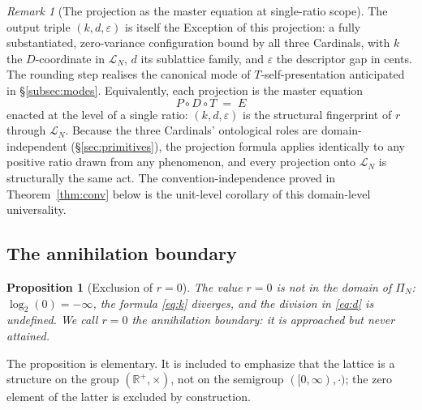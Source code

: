 \documentclass[11pt,a4paper]{article}
\newtheorem{proposition}[theorem]{Proposition}
\theoremstyle{definition}
\theoremstyle{remark}
\newtheorem{remark}[theorem]{Remark}
\newcommand{\R}{\mathbb{R}}
\newcommand{\eps}{\varepsilon}
\newcommand{\PDT}{\ensuremath{P{\circ}D{\circ}T}}
\begin{document}
\begin{remark}[The projection as the master equation at single-ratio scope]\label{rem:single-ratio-exception}
The output triple $(k,d,\eps)$ is itself the Exception of this projection: a fully substantiated, zero-variance configuration bound by all three Cardinals, with $k$ the $D$-coordinate in $\mathcal{L}_{N}$, $d$ its sublattice family, and $\eps$ the descriptor gap in cents. The rounding step realises the canonical mode of $T$-self-presentation anticipated in \S\ref{subsec:modes}. Equivalently, each projection is the master equation
\[
\PDT \;=\; E
\]
enacted at the level of a single ratio: $(k,d,\eps)$ is the structural fingerprint of $r$ through $\mathcal{L}_{N}$. Because the three Cardinals' ontological roles are domain-independent (\S\ref{sec:primitives}), the projection formula applies identically to any positive ratio drawn from any phenomenon, and every projection onto $\mathcal{L}_{N}$ is structurally the same act. The convention-independence proved in Theorem~\ref{thm:conv} below is the unit-level corollary of this domain-level universality.
\end{remark}

\subsection{The annihilation boundary}

\begin{proposition}[Exclusion of $r=0$]\label{prop:zero}
The value $r=0$ is not in the domain of $\Pi_{N}$: $\log_{2}(0)=-\infty$, the formula \eqref{eq:k} diverges, and the division in \eqref{eq:d} is undefined. We call $r=0$ the \emph{annihilation boundary}: it is approached but never attained.
\end{proposition}

The proposition is elementary. It is included to emphasize that the lattice is a structure on the group $(\R^{+},\times)$, not on the semigroup $([0,\infty),\cdot)$; the zero element of the latter is excluded by construction.
\end{document}
